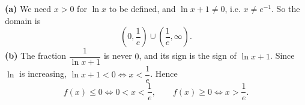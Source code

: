 \textbf{(a)} We need $x>0$ for $\ln x$ to be defined, and $\ln x+1\ne0$, i.e. $x\ne e^{-1}$. So the domain is
\[
\boxed{\left(0,\dfrac{1}{e}\right)\cup\left(\dfrac{1}{e},\infty\right)}.
\]
\textbf{(b)} The fraction $\dfrac{1}{\ln x+1}$ is never $0$, and its sign is the sign of $\ln x+1$. Since $\ln$ is increasing, $\ln x+1<0\iff x<\dfrac{1}{e}$. Hence
\[
f(x)\le0\iff 0<x<\dfrac{1}{e},\qquad f(x)\ge0\iff x>\dfrac{1}{e} .
\]
